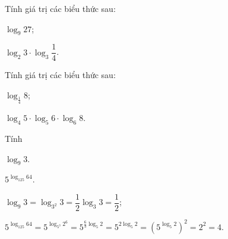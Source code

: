 \begin{bt}%
	Tính giá trị các biểu thức sau:
	\begin{listEX}[2]
		\item[a)] $ \log_9 27$;
		\item[b)] $ \log_2 3\cdot \log_3 \dfrac{1}{4}$.
	\end{listEX}
\end{bt}

\begin{bt}%
	Tính giá trị các biểu thức sau:
	\begin{listEX}[2]
		\item[a)] $ \log_{\frac{1}{4}} 8$;
		\item[b)] $ \log_4 5\cdot \log_5 6\cdot \log_6 8$.
	\end{listEX}
\end{bt}

\begin{bt}%
 
	Tính
	\begin{listEX}[2]
		\item  $\log _{9} 3$.
		\item $5^{\log _{125} 64}$.
	\end{listEX}
	\loigiai
	{\begin{listEX}[1]
			\item $ \log _{9} 3=\log _{3^{2}} 3=\dfrac{1}{2} \log _{3} 3=\dfrac{1}{2}$;
			\item $5^{\log _{125} 64}=5^{\log _{5^3} 2^6}=5^{\frac{6}{3}\log _{5} 2}=5^{2\log _{5} 2}=\left({5^{\log _{5} 2}}\right)^2=2^2=4$.
		\end{listEX}
	}
\end{bt}

